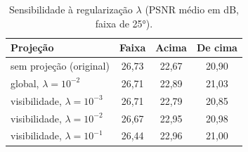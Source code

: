 \begin{table}[t]
\centering
\caption{Sensibilidade à regularização $\lambda$ (PSNR médio em dB, faixa de 25°).}
\label{tab:lambda}
\begin{tabular}{l ccc}
\toprule
Projeção & Faixa & Acima & De cima \\
\midrule
sem projeção (original) & 26{,}73 & 22{,}67 & 20{,}90 \\
global, $\lambda=10^{-2}$ & 26{,}71 & 22{,}89 & 21{,}03 \\
visibilidade, $\lambda=10^{-3}$ & 26{,}71 & 22{,}79 & 20{,}85 \\
visibilidade, $\lambda=10^{-2}$ & 26{,}67 & 22{,}95 & 20{,}98 \\
visibilidade, $\lambda=10^{-1}$ & 26{,}44 & 22{,}96 & 21{,}00 \\
\bottomrule
\end{tabular}
\end{table}
